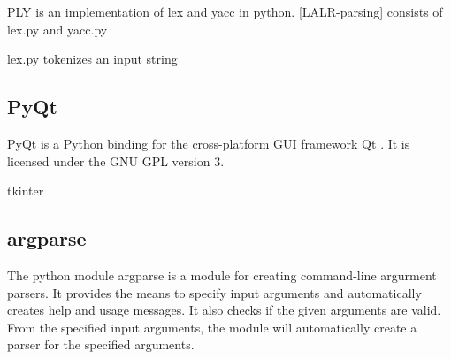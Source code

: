 \acf{PLY} \cite{PLY} is an implementation of lex and yacc in python.
[LALR-parsing]
consists of lex.py and yacc.py

lex.py tokenizes an input string\
\subsection{PyQt}\label{sec:BackgroundPytonPyQt}
PyQt is a Python binding for the cross-platform GUI framework Qt \cite{PyQt}.
It is licensed under the GNU GPL version 3.


tkinter
\subsection{argparse}\label{sec:BackgroundArgparse}
The python module argparse \cite{argparse} is a module for creating command-line argurment parsers.
It provides the means to specify input arguments and automatically creates help and usage messages.
It also checks if the given arguments are valid.
From the specified input arguments, the module will automatically create a parser for the specified arguments.